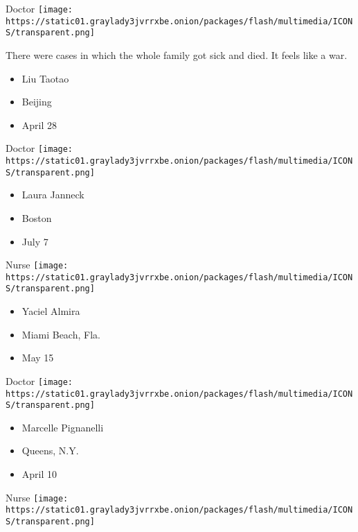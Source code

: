 \protect\hyperlink{item-liu-taotao}{}

Doctor
\texttt{[image: https://static01.graylady3jvrrxbe.onion/packages/flash/multimedia/ICONS/transparent.png]}

There were cases in which the whole family got sick and died. It feels
like a war.

\begin{itemize}
\tightlist
\item
  Liu Taotao
\item
  Beijing
\item
  April 28
\end{itemize}

\protect\hyperlink{item-laura-janneck}{}

Doctor
\texttt{[image: https://static01.graylady3jvrrxbe.onion/packages/flash/multimedia/ICONS/transparent.png]}

\begin{itemize}
\tightlist
\item
  Laura Janneck
\item
  Boston
\item
  July 7
\end{itemize}

\protect\hyperlink{item-yaciel-almira}{}

Nurse
\texttt{[image: https://static01.graylady3jvrrxbe.onion/packages/flash/multimedia/ICONS/transparent.png]}

\begin{itemize}
\tightlist
\item
  Yaciel Almira
\item
  Miami Beach, Fla.
\item
  May 15
\end{itemize}

\protect\hyperlink{item-marcelle-pignanelli}{}

Doctor
\texttt{[image: https://static01.graylady3jvrrxbe.onion/packages/flash/multimedia/ICONS/transparent.png]}

\begin{itemize}
\tightlist
\item
  Marcelle Pignanelli
\item
  Queens, N.Y.
\item
  April 10
\end{itemize}

\protect\hyperlink{item-moussa-alzouma-mahamadou}{}

Nurse
\texttt{[image: https://static01.graylady3jvrrxbe.onion/packages/flash/multimedia/ICONS/transparent.png]}

